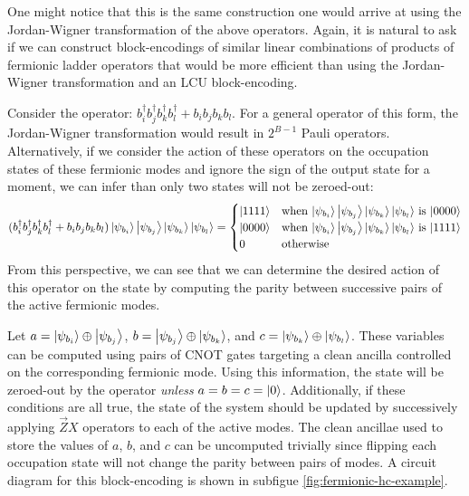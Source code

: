 One might notice that this is the same construction one would arrive at using the Jordan-Wigner transformation of the above operators.
Again, it is natural to ask if we can construct block-encodings of similar linear combinations of products of fermionic ladder operators that would be more efficient than using the Jordan-Wigner transformation and an LCU block-encoding.

Consider the operator: $b_i^\dagger b_j^\dagger b_k^\dagger b_l^\dagger +  b_i b_j b_k b_l$.
For a general operator of this form, the Jordan-Wigner transformation would result in $2^{B - 1}$ Pauli operators.
Alternatively, if we consider the action of these operators on the occupation states of these fermionic modes and ignore the sign of the output state for a moment, we can infer than only two states will not be zeroed-out:
\begin{equation}
    \begin{split}
        (b_i^\dagger b_j^\dagger b_k^\dagger b_l^\dagger +  b_i b_j b_k b_l) \ket{\psi_{b_i}}\ket{\psi_{b_j}}\ket{\psi_{b_k}}\ket{\psi_{b_l}} = \begin{cases} 
            \ket{1111} & \text{when $\ket{\psi_{b_i}}\ket{\psi_{b_j}}\ket{\psi_{b_k}}\ket{\psi_{b_l}}$ is $\ket{0000}$} \\
            \ket{0000} & \text{when $\ket{\psi_{b_i}}\ket{\psi_{b_j}}\ket{\psi_{b_k}}\ket{\psi_{b_l}}$ is $\ket{1111}$} \\
            0 & \text{otherwise} \\
                                        \end{cases}
    \end{split}
\end{equation}
From this perspective, we can see that we can determine the desired action of this operator on the state by computing the parity between successive pairs of the active fermionic modes.

Let $a = \ket{\psi_{b_i}} \oplus \ket{\psi_{b_j}}$, $b = \ket{\psi_{b_j}} \oplus \ket{\psi_{b_k}}$, and $c = \ket{\psi_{b_k}} \oplus \ket{\psi_{b_l}}$.
These variables can be computed using pairs of CNOT gates targeting a clean ancilla controlled on the corresponding fermionic mode.
Using this information, the state will be zeroed-out by the operator \textit{unless} $a = b = c = \ket{0}$.
Additionally, if these conditions are all true, the state of the system should be updated by successively applying $\vec{Z}X$ operators to each of the active modes.
The clean ancillae used to store the values of $a$, $b$, and $c$ can be uncomputed trivially since flipping each occupation state will not change the parity between pairs of modes.
A circuit diagram for this block-encoding is shown in subfigue \ref{fig:fermionic-hc-example}.


